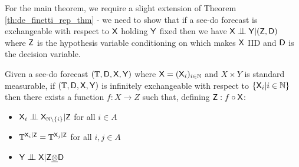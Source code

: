 



For the main theorem, we require a slight extension of Theorem \ref{th:de_finetti_rep_thm} - we need to show that if a see-do forecast is exchangeable with respect to $\mathsf{X}$ holding $\mathsf{Y}$ fixed then we have $\RV{X}\CI\RV{Y}|(\RV{Z,D})$ where $\mathsf{Z}$ is the hypothesis variable conditioning on which makes $\mathsf{X}$ IID and $\mathsf{D}$ is the decision variable.

\begin{lemma}\label{lem:rep_seedo_obs}
Given a see-do forecast $(\mathbb{T},\mathsf{D},\mathsf{X},\mathsf{Y})$ where $\mathsf{X}=(\mathsf{X}_i)_{i\in\mathbb{N}}$ and $X\times Y$ is standard measurable, if $(\mathbb{T},\mathsf{D},\mathsf{X},\mathsf{Y})$ is infinitely exchangeable with respect to $\{\mathsf{X}_i|i\in \mathbb{N}\}$ then there exists a function $f:X\to Z$ such that, defining $\mathsf{Z}:f\circ \mathsf{X}$:
\begin{itemize}
    \item $\RV{X}_i\CI\RV{X}_{\mathbb{N}\setminus\{i\}}|\RV{Z}$ for all $i\in A$
    \item $\mathbb{T}^{\mathsf{X}_i|\mathsf{Z}}=\mathbb{T}^{\mathsf{X}_j|\mathsf{Z}}$ for all $i,j\in A$
    \item $\RV{Y}\CI\RV{X}|\RV{Z}\utimes \RV{D}$
\end{itemize}
\end{lemma}

